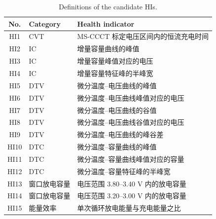 \begin{table}
\TableStyle
\caption{Definitions of the candidate HIs.}
\label{tab:2-2}
\begin{tabularx}{\linewidth}{@{\extracolsep{\fill}}C{0.30}L{0.65}L{2.05}@{}}
\toprule
No. & Category & Health indicator \\
\midrule
HI1 & CVT & MS-CCCT 标定电压区间内的恒流充电时间 \\
HI2 & IC & 增量容量曲线的峰值 \\
HI3 & IC & 增量容量峰值对应的电压 \\
HI4 & IC & 增量容量特征峰的半峰宽 \\
HI5 & DTV & 微分温度--电压曲线的峰值 \\
HI6 & DTV & 微分温度--电压曲线峰值对应的电压 \\
HI7 & DTV & 微分温度--电压曲线的谷值 \\
HI8 & DTV & 微分温度--电压曲线谷值对应的电压 \\
HI9 & DTV & 微分温度--电压曲线的峰谷差 \\
HI10 & DTC & 微分温度--容量曲线的峰值 \\
HI11 & DTC & 微分温度--容量曲线峰值对应的容量 \\
HI12 & DTC & 微分温度--容量特征峰的半峰宽 \\
HI13 & 窗口放电容量 & 电压范围 3.80--3.40 V 内的放电容量 \\
HI14 & 窗口放电容量 & 电压范围 3.20--3.00 V 内的放电容量 \\
HI15 & 能量效率 & 单次循环放电能量与充电能量之比 \\
\bottomrule
\end{tabularx}
\end{table}
